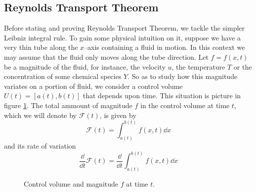 
\subsection{Reynolds Transport Theorem}

Before stating and proving Reynolds Transport Theorem, we tackle the simpler
Leibniz integral rule. To gain some physical intuition on it, suppose we have a
very thin tube along the $x$--axis containing a fluid in motion. In this context
we may assume that the fluid only moves along the tube direction. Let $f =
f(x,t)$ be a magnitude of the fluid, for instance, the velocity $u$, the
temperature $T$ or the concentration of some chemical species $Y$. So as to
study how this magnitude variates on a portion of fluid, we consider a control
volume $U(t) = [a(t), b(t)]$ that depends upon time. This situation is picture
in figure \ref{fig:reynolds_transport_theorem_leibniz_rule}. The total ammount
of magnitude $f$ in the control volume at time $t$, which we will denote by
$\mathcal{F}(t)$, is given by
\begin{equation*}
	\mathcal{F}(t) = \int_{a(t)}^{b(t)} f(x,t) \dd{x}
\end{equation*}
and its rate of variation 
\begin{equation} \label{eq:reynolds_transport_theorem_motivation}
	\frac{\dd}{\dd{t}} \mathcal{F}(t) = 
	\frac{\dd}{\dd{t}} \int_{a(t)}^{b(t)} f(x,t) \dd{x}
\end{equation}

\begin{figure}[ht]
	\centering
	\caption{Control volume and magnitude $f$ at time $t$.}
	\label{fig:reynolds_transport_theorem_leibniz_rule}
\end{figure}

